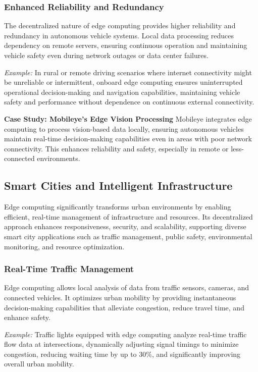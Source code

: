 \documentclass[runningheads]{llncs}
\begin{document}
\subsubsection{Enhanced Reliability and Redundancy}
The decentralized nature of edge computing provides higher reliability and redundancy in autonomous vehicle systems. Local data processing reduces dependency on remote servers, ensuring continuous operation and maintaining vehicle safety even during network outages or data center failures.

\noindent\textit{Example:} In rural or remote driving scenarios where internet connectivity might be unreliable or intermittent, onboard edge computing ensures uninterrupted operational decision-making and navigation capabilities, maintaining vehicle safety and performance without dependence on continuous external connectivity.

\noindent\textbf{Case Study: Mobileye's Edge Vision Processing}
Mobileye integrates edge computing to process vision-based data locally, ensuring autonomous vehicles maintain real-time decision-making capabilities even in areas with poor network connectivity. This enhances reliability and safety, especially in remote or less-connected environments.

\subsection{Smart Cities and Intelligent Infrastructure}

Edge computing significantly transforms urban environments by enabling efficient, real-time management of infrastructure and resources. Its decentralized approach enhances responsiveness, security, and scalability, supporting diverse smart city applications such as traffic management, public safety, environmental monitoring, and resource optimization.

\subsubsection{Real-Time Traffic Management}
Edge computing allows local analysis of data from traffic sensors, cameras, and connected vehicles. It optimizes urban mobility by providing instantaneous decision-making capabilities that alleviate congestion, reduce travel time, and enhance safety.

\noindent\textit{Example:} Traffic lights equipped with edge computing analyze real-time traffic flow data at intersections, dynamically adjusting signal timings to minimize congestion, reducing waiting time by up to 30\%, and significantly improving overall urban mobility.
\end{document}
